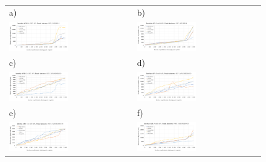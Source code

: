 \begin{figure}[H]
  \centering
	\begin{tabular}{@{}ll@{}}
    a) & b) \\
    \includegraphics[width=0.49\textwidth]{rys05/response-dotnet-fetchAllBills.pdf} & \includegraphics[width=0.49\textwidth]{rys05/response-nodejs-fetchAllBills.pdf} \\
    c) & d) \\
    \includegraphics[width=0.49\textwidth]{rys05/response-dotnet-getSingleOrder.pdf} & \includegraphics[width=0.49\textwidth]{rys05/response-nodejs-getSingleOrder.pdf} \\
    e) & f) \\
    \includegraphics[width=0.49\textwidth]{rys05/response-dotnet-addProduct.pdf} & \includegraphics[width=0.49\textwidth]{rys05/response-nodejs-addProduct.pdf} \\

\end{tabular}
\end{figure}
